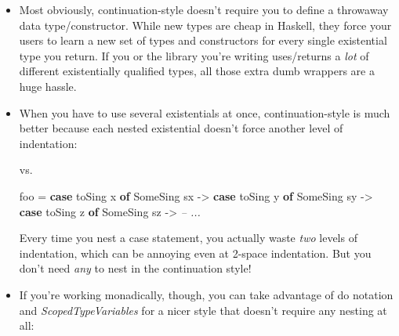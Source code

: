 \documentclass[]{article}
\newenvironment{Shaded}{}{}
\newcommand{\KeywordTok}[1]{\textcolor[rgb]{0.00,0.44,0.13}{\textbf{{#1}}}}
\newcommand{\DataTypeTok}[1]{\textcolor[rgb]{0.56,0.13,0.00}{{#1}}}
\newcommand{\CommentTok}[1]{\textcolor[rgb]{0.38,0.63,0.69}{\textit{{#1}}}}
\newcommand{\OtherTok}[1]{\textcolor[rgb]{0.00,0.44,0.13}{{#1}}}
\newcommand{\FunctionTok}[1]{\textcolor[rgb]{0.02,0.16,0.49}{{#1}}}
\newcommand{\NormalTok}[1]{{#1}}
\begin{document}
\begin{itemize}
\item
  Most obviously, continuation-style doesn't require you to define a throwaway
  data type/constructor. While new types are cheap in Haskell, they force your
  users to learn a new set of types and constructors for every single
  existential type you return. If you or the library you're writing uses/returns
  a \emph{lot} of different existentially qualified types, all those extra dumb
  wrappers are a huge hassle.
\item
  When you have to use several existentials at once, continuation-style is much
  better because each nested existential doesn't force another level of
  indentation:

\begin{Shaded}
\end{Shaded}

  vs.

\begin{Shaded}
\begin{Highlighting}[]
\NormalTok{foo }\FunctionTok{=} \KeywordTok{case} \NormalTok{toSing x }\KeywordTok{of}
        \DataTypeTok{SomeSing} \NormalTok{sx }\OtherTok{->}
          \KeywordTok{case} \NormalTok{toSing y }\KeywordTok{of}
            \DataTypeTok{SomeSing} \NormalTok{sy }\OtherTok{->}
              \KeywordTok{case} \NormalTok{toSing z }\KeywordTok{of}
                \DataTypeTok{SomeSing} \NormalTok{sz }\OtherTok{->}
                  \CommentTok{-- ...}
\end{Highlighting}
\end{Shaded}

  Every time you nest a case statement, you actually waste \emph{two} levels of
  indentation, which can be annoying even at 2-space indentation. But you don't
  need \emph{any} to nest in the continuation style!
\item
  If you're working monadically, though, you can take advantage of do notation
  and \emph{ScopedTypeVariables} for a nicer style that doesn't require any
  nesting at all:


\end{itemize}
\end{document}
